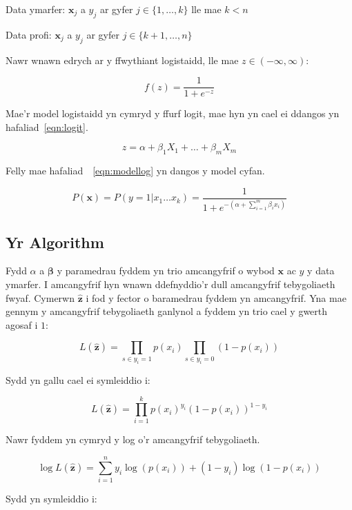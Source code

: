 Data ymarfer: $\mathbf{x}_j$ a $y_j$ ar gyfer $j \in \{ 1,\dots,k\}$ lle mae $k<n$

Data profi: $\mathbf{x}_j$ a $y_j$ ar gyfer $j \in \{ k+1,\dots,n \}$

Nawr wnawn edrych ar y ffwythiant logistaidd, lle mae $z \in (-\infty,\infty)$:

$$ f(z) = \frac{1}{1+e^{-z}} $$ 

Mae'r model logistaidd yn cymryd y ffurf logit, mae hyn yn cael ei ddangos yn hafaliad~\ref{eqn:logit}.

\begin{equation}\label{eqn:logit} 
    z = \alpha + \beta_{1}X_{1} + \dots + \beta_{m}X_{m} 
\end{equation} %

Felly mae hafaliad~~\ref{eqn:modellog} yn dangos y model cyfan.

\begin{equation}\label{eqn:modellog}
    P(\mathbf{x}) = P(y = 1 | x_1 \dots x_k) = \frac{1}{1+e^{-( \alpha + \sum_{i=1}^{m} \beta_{i}x_{i})}} 
\end{equation}

\subsection{Yr Algorithm}
\cite{Logistic-regression}
Fydd $\alpha$ a $\mathbf{\beta}$ y paramedrau fyddem yn trio amcangyfrif o wybod $\mathbf{x}$ ac $y$ y data ymarfer. I amcangyfrif hyn wnawn ddefnyddio'r dull amcangyfrif tebygoliaeth fwyaf. Cymerwn $\hat{\mathbf{z}}$ i fod y fector o baramedrau fyddem yn amcangyfrif. Yna mae gennym y amcangyfrif tebygoliaeth ganlynol a fyddem yn trio cael y gwerth agosaf i $1$:

$$ L(\hat{\mathbf{z}}) = \prod_{s \in y_{i}=1} p(x_i) \prod_{s \in y_{i}=0} (1 - p(x_i))$$ %

Sydd yn gallu cael ei symleiddio i:

$$ L(\hat{\mathbf{z}}) = \prod_{i=1}^{k} p(x_i)^{y_i} (1 - p(x_i))^{1-y_i} $$

Nawr fyddem yn cymryd y log o'r amcangyfrif tebygoliaeth.

$$ \log L(\hat{\mathbf{z}}) = \sum_{i=1}^{n} y_{i} \log(p(x_{i})) + (1-y_{i}) \log(1-p(x_{i})) $$

Sydd yn symleiddio i:

